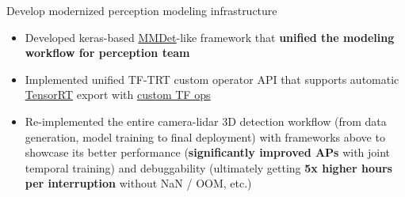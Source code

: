 \documentclass{resume}
\begin{document}
Develop modernized perception modeling infrastructure
\begin{itemize}
  \item Developed keras-based \href{https://github.com/open-mmlab/mmdetection3d}{\underline{MMDet}}-like framework that \textbf{unified the modeling workflow for perception team}
  \item Implemented unified TF-TRT custom operator API that supports automatic \href{https://docs.nvidia.com/deeplearning/tensorrt/operators/docs/PluginV2.html}{\underline{TensorRT}} export with \href{https://www.tensorflow.org/guide/create_op}{\underline{custom TF ops}}
  \item Re-implemented the entire camera-lidar 3D detection workflow (from data generation, model training to final deployment) with frameworks above to showcase its better performance (\textbf{significantly improved APs} with joint temporal training) and debuggability (ultimately getting \textbf{5x higher hours per interruption} without NaN / OOM, etc.)
\end{itemize}
\end{document}
